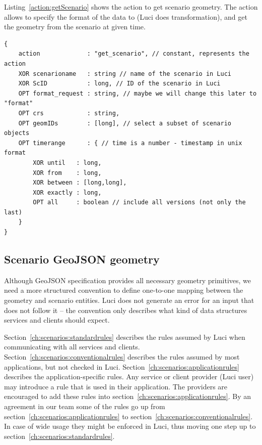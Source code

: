 Listing~\ref{action:getScenario} shows the action to get scenario geometry.
The action allows to specify the format of the data to (\ac{Luci} does transformation),
and get the geometry from the scenario at given time.
\begin{lstlisting}[caption={JSON action structure for getting a scenario from \ac{Luci}}, label={action:getScenario}]
{
	action             : "get_scenario", // constant, represents the action
	XOR scenarioname   : string // name of the scenario in Luci
	XOR ScID           : long, // ID of the scenario in Luci
	OPT format_request : string, // maybe we will change this later to "format"
	OPT crs            : string,
	OPT geomIDs        : [long], // select a subset of scenario objects
	OPT timerange      : { // time is a number - timestamp in unix format
		XOR until   : long,
		XOR from    : long,
		XOR between : [long,long],
		XOR exactly : long,
		OPT all     : boolean // include all versions (not only the last)
	}
}
\end{lstlisting}

\subsection{Scenario GeoJSON geometry}
\label{sec:services:scenario}

Although GeoJSON specification provides all necessary geometry primitives,
we need a more structured convention to define one-to-one mapping between the geometry and scenario entities.
\ac{Luci} does not generate an error for an input that does not follow it -- the convention only describes what kind of data structures services and clients should expect.

Section~\ref{ch:scenarios:standardrules} describes the rules assumed by \ac{Luci} when communicating with all services and clients.
Section~\ref{ch:scenarios:conventionalrules} describes the rules assumed by most applications, but not checked in \ac{Luci}.
Section~\ref{ch:scenarios:applicationrules} describes the application-specific rules.
Any service or client provider (\ac{Luci} user) may introduce a rule that is used in their application.
The providers are encouraged to add these rules into section~\ref{ch:scenarios:applicationrules}.
By an agreement in our team some of the rules go up from section~\ref{ch:scenarios:applicationrules} to section~\ref{ch:scenarios:conventionalrules}.
In case of wide usage they might be enforced in \ac{Luci}, thus moving one step up to section~\ref{ch:scenarios:standardrules}.

